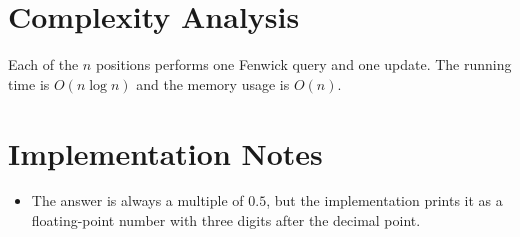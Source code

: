 \documentclass[11pt]{article}
\begin{document}
\section*{Complexity Analysis}

Each of the $n$ positions performs one Fenwick query and one update. The running time is
$O(n \log n)$ and the memory usage is $O(n)$.

\section*{Implementation Notes}

\begin{itemize}[leftmargin=*]
    \item The answer is always a multiple of $0.5$, but the implementation prints it as a floating-point
    number with three digits after the decimal point.
\end{itemize}
\end{document}
